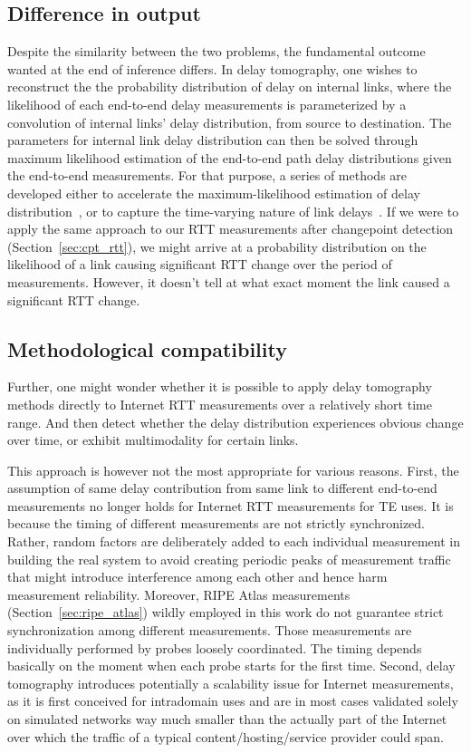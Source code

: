 \subsection{Difference in output}
Despite the similarity between the two problems, the fundamental outcome wanted at the end of inference differs.
In delay tomography, one wishes to reconstruct the the probability distribution of delay on internal links, where the likelihood of each end-to-end delay measurements is parameterized by a convolution of internal links' delay distribution, from source to destination.
The parameters for internal link delay distribution can then be solved through maximum likelihood estimation of the end-to-end path delay distributions given the end-to-end measurements.
For that purpose, a series of methods are developed either to accelerate the maximum-likelihood estimation of delay distribution~\cite{Liang2003, Tsang2003}, or to capture the time-varying nature of link delays~\cite{Shih2003,Coates2002a,Tsang2003}.
If we were to apply the same approach to our RTT measurements after changepoint detection (Section~\ref{sec:cpt_rtt}), we might arrive at a probability distribution on the likelihood of a link causing significant RTT change over the period of measurements. However, it doesn't tell at what exact moment the link caused a significant RTT change.

\subsection{Methodological compatibility}
Further, one might wonder whether it is possible to apply delay tomography methods directly to Internet RTT measurements over a relatively short time range. And then detect whether the delay distribution experiences obvious change over time, or exhibit multimodality for certain links.

This approach is however not the most appropriate for various reasons. First, the assumption of
same delay contribution from same link to different end-to-end measurements no longer holds for Internet RTT measurements for TE uses. It is because the timing of different measurements are not strictly synchronized. Rather, random factors are deliberately added to each individual measurement in building the real system to avoid creating periodic peaks of measurement traffic that might introduce interference among each other and hence harm measurement reliability. Moreover,  RIPE Atlas measurements (Section~\ref{sec:ripe_atlas}) wildly employed in this work do not guarantee strict synchronization among different measurements.
Those measurements are individually performed by probes loosely coordinated. The timing depends basically on the moment when each probe starts for the first time.
Second, delay tomography introduces potentially a scalability issue for Internet measurements, as it is first conceived for intradomain uses and are in most cases validated solely on simulated networks way much smaller than the actually part of the Internet over which the traffic of a typical content/hosting/service provider could span.

